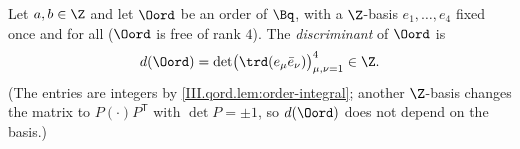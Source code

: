 Let $a,b\in\Z$ and let $\Oord$ be an order of $\Bq$, with a $\Z$-basis $e_1,\dots,e_4$ fixed once and for all ($\Oord$ is free of
rank $4$). The \emph{discriminant} of $\Oord$ is
\[
  d(\Oord)=\det\bigl(\trd(e_\mu\bar e_\nu)\bigr)_{\mu,\nu=1}^{4}\in\Z.
\]
(The entries are integers by \cref{III.qord.lem:order-integral}; another $\Z$-basis changes the matrix to $P(\cdot)P^{\mathsf T}$ with
$\det P=\pm1$, so $d(\Oord)$ does not depend on the basis.)
